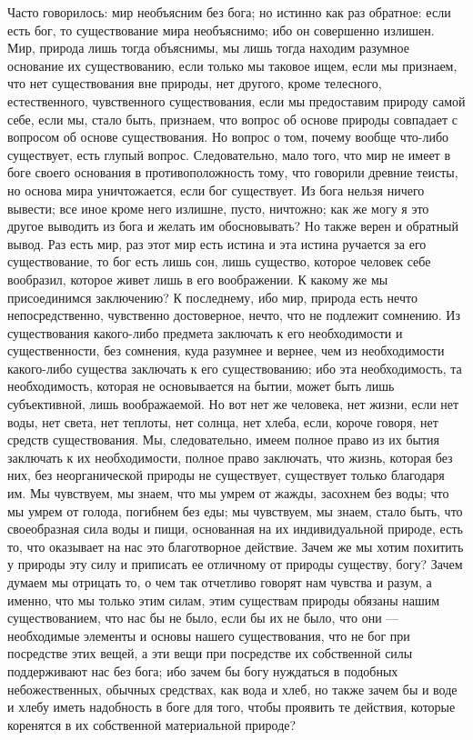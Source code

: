 \documentclass[12pt]{article}
\begin{document}
Часто говорилось: мир необъясним без бога; но истинно как раз обратное: если есть бог, то существование мира необъяснимо; ибо он совершенно излишен. Мир, природа лишь тогда объяснимы, мы лишь тогда находим разумное основание их существованию, если только мы таковое ищем, если мы признаем, что нет существования вне природы, нет другого, кроме телесного, естественного, чувственного существования, если мы предоставим природу самой себе, если мы, стало быть, признаем, что вопрос об основе природы совпадает с вопросом об основе существования. Но вопрос о том, почему вообще что-либо существует, есть глупый вопрос. Следовательно, мало того, что мир не имеет в боге своего основания в противоположность тому, что говорили древние теисты, но основа мира уничтожается, если бог существует. Из бога нельзя ничего вывести; все иное кроме него излишне, пусто, ничтожно; как же могу я это другое выводить из бога и желать им обосновывать? Но также верен и обратный вывод. Раз есть мир, раз этот мир есть истина и эта истина ручается за его существование, то бог есть лишь сон, лишь существо, которое человек себе вообразил, которое живет лишь в его воображении. К какому же мы присоединимся заключению? К последнему, ибо мир, природа есть нечто непосредственно, чувственно достоверное, нечто, что не подлежит сомнению. Из существования какого-либо предмета заключать к его необходимости и существенности, без сомнения, куда разумнее и вернее, чем из необходимости какого-либо существа заключать к его существованию; ибо эта необходимость, та необходимость, которая не основывается на бытии, может быть лишь субъективной, лишь воображаемой. Но вот нет же человека, нет жизни, если нет воды, нет света, нет теплоты, нет солнца, нет хлеба, если, короче говоря, нет средств существования. Мы, следовательно, имеем полное право из их бытия заключать к их необходимости, полное право заключать, что жизнь, которая без них, без неорганической природы не существует, существует только благодаря им. Мы чувствуем, мы знаем, что мы умрем от жажды, засохнем без воды; что мы умрем от голода, погибнем без еды; мы чувствуем, мы знаем, стало быть, что своеобразная сила воды и пищи, основанная на их индивидуальной природе, есть то, что оказывает на нас это благотворное действие. Зачем же мы хотим похитить у природы эту силу и приписать ее отличному от природы существу, богу? Зачем думаем мы отрицать то, о чем так отчетливо говорят нам чувства и разум, а именно, что мы только этим силам, этим существам природы обязаны нашим существованием, что нас бы не было, если бы их не было, что они --- необходимые элементы и основы нашего существования, что не бог при посредстве этих вещей, а эти вещи при посредстве их собственной силы поддерживают нас без бога; ибо зачем бы богу нуждаться в подобных небожественных, обычных средствах, как вода и хлеб, но также зачем бы и воде и хлебу иметь надобность в боге для того, чтобы проявить те действия, которые коренятся в их собственной материальной природе? 
\end{document}
